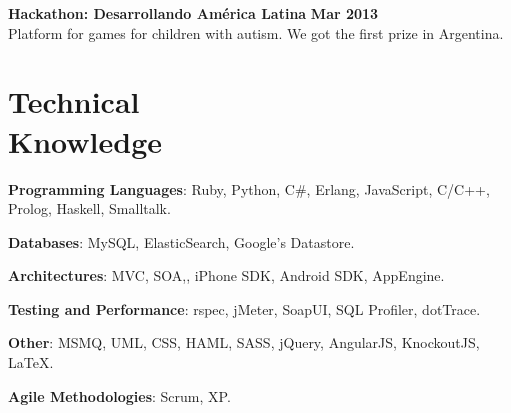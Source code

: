 \documentclass[margin,line]{resume}
\begin{document}
\begin{resume}
\textbf{Hackathon: Desarrollando Am\'erica Latina} \hfill \textbf{Mar 2013} \vspace{2mm} \\
Platform for games for children with autism. We got the first prize in Argentina.

\newpage


\section{\mysidestyle Technical\\Knowledge}

\textbf{Programming Languages}: Ruby, Python, C\#, Erlang, JavaScript, C/C++, Prolog, Haskell, Smalltalk. \vspace{-2mm}
    
\textbf{Databases}: MySQL, ElasticSearch, Google's Datastore. \vspace{-2mm}

\textbf{Architectures}: MVC, SOA,, iPhone SDK, Android SDK, AppEngine. \vspace{-2mm}

\textbf{Testing and Performance}: rspec, jMeter, SoapUI, SQL Profiler, dotTrace.\vspace{-2mm}
   
\textbf{Other}: MSMQ, UML, CSS, HAML, SASS, jQuery, AngularJS, KnockoutJS, \LaTeX . \vspace{-2mm}
    
\textbf{Agile Methodologies}: Scrum, XP. \vspace{-2mm}
    

\end{resume}
\end{document}
